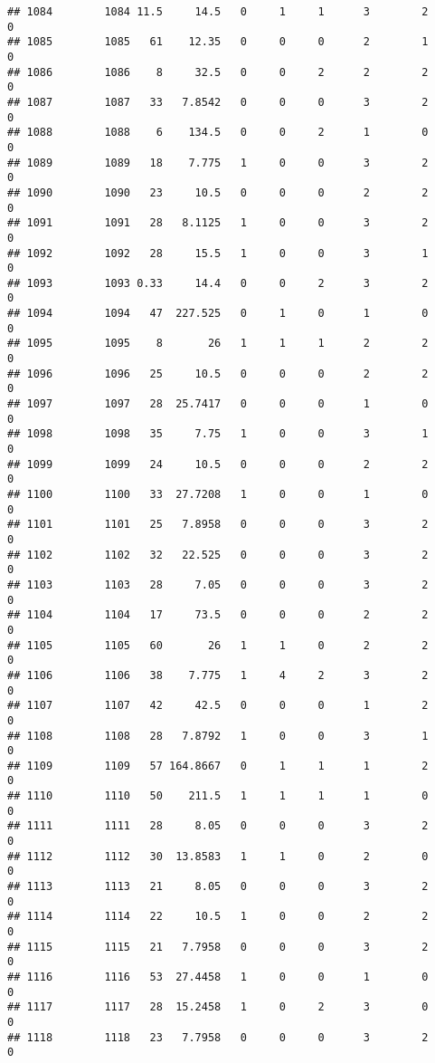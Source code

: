 \documentclass[
]{article}
\begin{document}
\begin{verbatim}
## 1084        1084 11.5     14.5   0     1     1      3        2         0
## 1085        1085   61    12.35   0     0     0      2        1         0
## 1086        1086    8     32.5   0     0     2      2        2         0
## 1087        1087   33   7.8542   0     0     0      3        2         0
## 1088        1088    6    134.5   0     0     2      1        0         0
## 1089        1089   18    7.775   1     0     0      3        2         0
## 1090        1090   23     10.5   0     0     0      2        2         0
## 1091        1091   28   8.1125   1     0     0      3        2         0
## 1092        1092   28     15.5   1     0     0      3        1         0
## 1093        1093 0.33     14.4   0     0     2      3        2         0
## 1094        1094   47  227.525   0     1     0      1        0         0
## 1095        1095    8       26   1     1     1      2        2         0
## 1096        1096   25     10.5   0     0     0      2        2         0
## 1097        1097   28  25.7417   0     0     0      1        0         0
## 1098        1098   35     7.75   1     0     0      3        1         0
## 1099        1099   24     10.5   0     0     0      2        2         0
## 1100        1100   33  27.7208   1     0     0      1        0         0
## 1101        1101   25   7.8958   0     0     0      3        2         0
## 1102        1102   32   22.525   0     0     0      3        2         0
## 1103        1103   28     7.05   0     0     0      3        2         0
## 1104        1104   17     73.5   0     0     0      2        2         0
## 1105        1105   60       26   1     1     0      2        2         0
## 1106        1106   38    7.775   1     4     2      3        2         0
## 1107        1107   42     42.5   0     0     0      1        2         0
## 1108        1108   28   7.8792   1     0     0      3        1         0
## 1109        1109   57 164.8667   0     1     1      1        2         0
## 1110        1110   50    211.5   1     1     1      1        0         0
## 1111        1111   28     8.05   0     0     0      3        2         0
## 1112        1112   30  13.8583   1     1     0      2        0         0
## 1113        1113   21     8.05   0     0     0      3        2         0
## 1114        1114   22     10.5   1     0     0      2        2         0
## 1115        1115   21   7.7958   0     0     0      3        2         0
## 1116        1116   53  27.4458   1     0     0      1        0         0
## 1117        1117   28  15.2458   1     0     2      3        0         0
## 1118        1118   23   7.7958   0     0     0      3        2         0

\end{verbatim}
\end{document}
